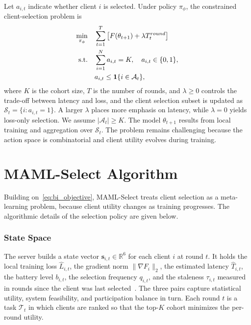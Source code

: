 \documentclass[journal]{IEEEtran}
\theoremstyle{remark}
\newcommand{\revision}[1]{#1}
\begin{document}
\revision{Let $a_{i,t}$ indicate whether client $i$ is selected. Under policy $\pi_\phi$, the constrained client-selection problem is}
\begin{equation}
	\color{black}
	\begin{aligned}
		\min_{\pi_\phi}\quad & \sum_{t=1}^{T} \left[F(\theta_{t+1}) + \lambda T_t^{round}\right] \\
		\text{s.t.}\quad & \sum_{i=1}^{N} a_{i,t}=K,\quad a_{i,t}\in\{0,1\}, \\
		& a_{i,t}\leq \mathbf{1}\{i\in\mathcal{A}_t\},		
	\end{aligned}
	\label{eq:bi_objective}
\end{equation}
\revision{where $K$ is the cohort size, $T$ is the number of rounds, and $\lambda \geq 0$ controls the trade-off between latency and loss, and the client selection subset is updated as $\mathcal{S}_t=\{i:a_{i,t}=1\}$. A larger $\lambda$ places more emphasis on latency, while $\lambda=0$ yields loss-only selection. We assume $|\mathcal{A}_t|\geq K$. The model $\theta_{t+1}$ results from local training and aggregation over $\mathcal{S}_t$. The problem remains challenging because the action space is combinatorial and client utility evolves during training.}

\section{MAML-Select Algorithm}
\revision{Building on~\eqref{eq:bi_objective}, MAML-Select treats client selection as a meta-learning problem, because client utility changes as training progresses. The algorithmic details of the selection policy are given below.}

\subsubsection{State Space}
\revision{The server builds a state vector $\bm{s}_{i,t} \in \mathbb{R}^6$ for each client $i$ at round $t$. It holds the local training loss $\hat{L}_{i,t}$, the gradient norm $\|\nabla F_i\|_2$, the estimated latency $\hat{T}_{i,t}$, the battery level $b_{i,t}$, the selection frequency $q_{i,t}$, and the staleness $\tau_{i,t}$ measured in rounds since the client was last selected}~\cite{pan2024contextual,xu2024federated}. The three pairs capture statistical utility, system feasibility, and participation balance in turn. Each round $t$ is a task $\mathcal{T}_t$ in which clients are ranked so that the top-$K$ cohort minimizes the per-round utility.
\end{document}
